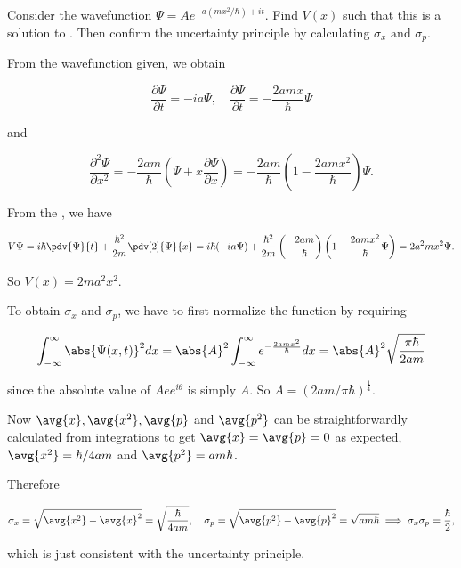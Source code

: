 \documentclass[a4paper,12pt]{report}
\begin{document}
{Consider the wavefunction \(\Psi = Ae^{-a(mx^2 / \hbar ) + it}\). Find \(V(x)\) such that this is a solution to \screq. Then confirm the uncertainty principle by calculating \(\sigma_x \text { and }  \sigma_p\).}
{From the wavefunction given, we obtain
			
\begin{equation}
  \frac{\partial \Psi }{\partial t} = -ia\Psi , \quad  \frac{\partial \Psi }{\partial t} = -\frac{2amx}{\hbar }\Psi    
\end{equation}

and
		
\begin{equation}
  \frac{\partial^2 \Psi }{\partial x^2} = -\frac{2am}{\hbar }\left(\Psi + x\frac{\partial \Psi }{\partial x} \right) = -\frac{2am}{\hbar }\left(1-\frac{2amx^2 }{\hbar } \right)\Psi .  
\end{equation}
		
From the \screq, we have 
		
\begin{equation}
  V\Psi = i\hbar\pdv{\Psi}{t} + \frac{\hbar^2}{2m}\pdv[2]{\Psi}{x} = i\hbar(-ia\Psi) + \frac{\hbar^2}{2m}\left(-\frac{2am}{\hbar}\right)\left(1-\frac{2amx^2}{\hbar}\Psi\right) = 2a^2mx^2\Psi.
\end{equation}
		
		
So \(V(x) = 2ma^2x^2\).
		
To obtain \(\sigma_x\) and \(\sigma_p\), we have to first normalize the function by requiring

\begin{equation}
  \int_{-\infty}^{\infty} \abs{\Psi (x,t)}^2 dx = \abs{A} ^2  \int_{-\infty}^{\infty} e^{-\frac{2amx^2 }{\hbar } } dx = \abs{A} ^2 \sqrt{\frac{\pi \hbar }{2am} }     
\end{equation}

since the absolute value of \(Aee^{i \theta }\) is simply \(A\). So \( A = (2am /\pi \hbar )^{\frac{1}{4} }\).
		
Now \(\avg{x}, \avg{x^2}, \avg{p}\) and \(\avg{p^2}\) can be straightforwardly calculated from integrations to get \(\avg{x} = \avg{p} = 0\) as expected, \(\avg{x^2} = \hbar / 4am\) and \(\avg{p^2} = am\hbar\).
		
Therefore 

\begin{equation}
  \sigma_x = \sqrt{\avg{x^2} - \avg{x}^2} = \sqrt{\frac{\hbar}{4am}}, \quad \sigma _{p} = \sqrt{\avg{p^2}-\avg{p}^2  } = \sqrt{am \hbar } \implies \sigma _{x}\sigma _{p} = \frac{\hbar }{2},       
\end{equation}

which is just consistent with the uncertainty principle.}
\end{document}
